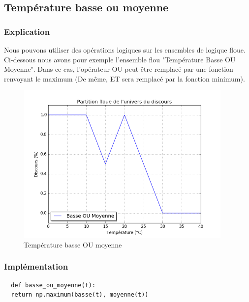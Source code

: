 \documentclass[a4paper]{article}
\begin{document}
\subsection{Température basse ou moyenne}

\subsubsection{Explication}
Nous pouvons utiliser des opérations logiques sur les ensembles de logique floue. Ci-dessous nous avons pour exemple l'ensemble flou "Température Basse OU Moyenne". Dans ce cas, l'opérateur OU peut-être remplacé par une fonction renvoyant le maximum (De même, ET sera remplacé par la fonction minimum).

\begin{figure}[h]
\begin{center}
	\includegraphics[width=400px]{plot_basse_ou_moyenne.png}
\end{center}
\caption{Température basse OU moyenne}
\end{figure}

\subsubsection{Implémentation}

\begin{lstlisting}
  def basse_ou_moyenne(t):
  return np.maximum(basse(t), moyenne(t))
\end{lstlisting}


\clearpage
\end{document}
